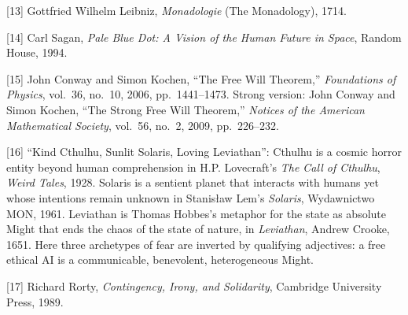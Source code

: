 \documentclass[11pt]{article}
\renewcommand{\\}[1][\mynewlineskip]{\oldnewline[#1]}
\begin{document}
{[13]} Gottfried Wilhelm Leibniz, \textit{Monadologie} (The Monadology), 1714.

{[14]} Carl Sagan, \textit{Pale Blue Dot: A Vision of the Human Future in Space}, Random House, 1994.

{[15]} John Conway and Simon Kochen, ``The Free Will Theorem,'' \textit{Foundations of Physics}, vol.\ 36, no.\ 10, 2006, pp.\ 1441--1473. Strong version: John Conway and Simon Kochen, ``The Strong Free Will Theorem,'' \textit{Notices of the American Mathematical Society}, vol.\ 56, no.\ 2, 2009, pp.\ 226--232.

{[16]} ``Kind Cthulhu, Sunlit Solaris, Loving Leviathan'': Cthulhu is a cosmic horror entity beyond human comprehension in H.P. Lovecraft's \textit{The Call of Cthulhu}, \textit{Weird Tales}, 1928. Solaris is a sentient planet that interacts with humans yet whose intentions remain unknown in Stanis{\l}aw Lem's \textit{Solaris}, Wydawnictwo MON, 1961. Leviathan is Thomas Hobbes's metaphor for the state as absolute Might that ends the chaos of the state of nature, in \textit{Leviathan}, Andrew Crooke, 1651. Here three archetypes of fear are inverted by qualifying adjectives: a free ethical AI is a communicable, benevolent, heterogeneous Might.

{[17]} Richard Rorty, \textit{Contingency, Irony, and Solidarity}, Cambridge University Press, 1989.
\end{document}
